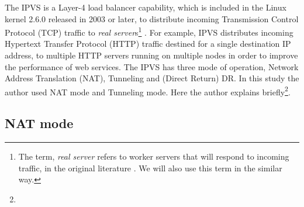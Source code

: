 The IPVS is a Layer-4 load balancer capability, which is included in the Linux kernel 2.6.0 released in 2003 or later, 
to distribute incoming Transmission Control Protocol (TCP) traffic  to 
{\em real server}s\footnote{The term, {\em real server} refers to worker servers that will respond to incoming traffic, 
in the original literature \cite{Zhang2000}. We will also use this term in the similar way.} \cite{Zhang2000}. 
For example, IPVS distributes incoming Hypertext Transfer Protocol (HTTP) traffic destined for a single destination IP address, to multiple HTTP servers running on multiple nodes in order to improve the performance of web services.
The IPVS has three mode of operation, Network Address Translation (NAT), Tunneling and (Direct Return) DR.
In this study the author used NAT mode and Tunneling mode.
Here the author explains  briefly\footnote{}.

\subsection{NAT mode}


